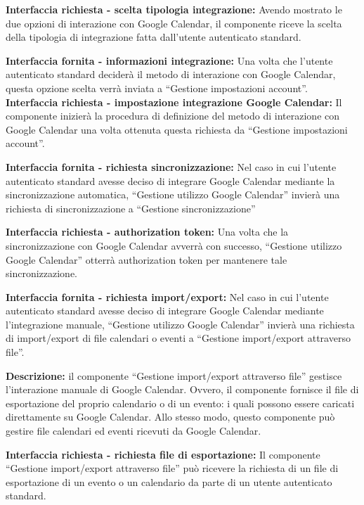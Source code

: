 \begin{listaPersonale}[DCI]{}
    \textbf{Interfaccia richiesta - scelta tipologia integrazione:} Avendo mostrato le due opzioni di interazione con Google Calendar, il componente riceve la scelta della tipologia di integrazione fatta dall'utente autenticato standard.

    \textbf{Interfaccia fornita - informazioni integrazione:} Una volta che l'utente autenticato standard deciderà il metodo di interazione con Google Calendar, questa opzione scelta verrà inviata a “Gestione impostazioni account”.
    \textbf{Interfaccia richiesta - impostazione integrazione Google
        Calendar:} Il componente inizierà la procedura di definizione del metodo di interazione con Google Calendar una volta ottenuta questa richiesta da “Gestione impostazioni account”.

    \textbf{Interfaccia fornita - richiesta sincronizzazione:} Nel caso in cui l'utente autenticato standard avesse deciso di integrare Google Calendar mediante la sincronizzazione automatica, “Gestione utilizzo Google Calendar” invierà una richiesta di sincronizzazione a “Gestione sincronizzazione”

    \textbf{Interfaccia richiesta - authorization token:} Una volta che la sincronizzazione con Google Calendar avverrà con successo, “Gestione utilizzo Google Calendar” otterrà authorization token per mantenere tale sincronizzazione.

    \textbf{Interfaccia fornita - richiesta import/export:}  Nel caso in cui l'utente autenticato standard avesse deciso di integrare Google Calendar mediante l'integrazione manuale, “Gestione utilizzo Google Calendar” invierà una richiesta di import/export di file calendari o eventi a “Gestione import/export attraverso file”.



    \textbf{Descrizione:} il componente “Gestione import/export attraverso file” gestisce l'interazione manuale di Google Calendar. Ovvero, il componente fornisce il file di esportazione del proprio calendario o di un evento: i quali possono essere caricati direttamente su Google Calendar. Allo stesso modo, questo componente può gestire file calendari ed eventi ricevuti da Google Calendar.

    \textbf{Interfaccia richiesta - richiesta file di esportazione:} Il componente “Gestione import/export attraverso file” può ricevere la richiesta di un file di esportazione di un evento o un calendario da parte di un utente autenticato standard.


\end{listaPersonale}
